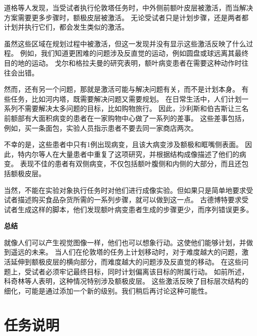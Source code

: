 道格等人\cite{dagher1999mapping}发现，当受试者执行伦敦塔任务时，中外侧前额叶皮层被激活，而当解决方案需要更多步骤时，额极皮层被激活。
无论受试者只是计划步骤，还是两者都计划并执行它们，都会发生类似的激活\cite{rowe2001imaging,unterrainer2005influence}。
\par


虽然这些区域在规划过程中被激活，但这一发现并没有显示这些激活反映了什么过程。
例如，我们知道更困难的问题涉及反直觉的运动，例如圆盘或球远离其最终目的地的运动\cite{goel1995frontal}。
戈尔和格拉夫曼\cite{goel1995frontal}的研究表明，额叶病变患者在需要这种动作时往往会出错。
\par


然而，还有另一个问题，那就是激活可能与解决问题有关，而不是计划本身。
有些任务，比如河内塔，既需要解决问题又需要规划。
在日常生活中，人们计划一系列不需要解决太多问题的目标，比如购物旅行。
因此，沙利斯和伯吉斯\cite{shallice1982specific}让三名前额部有大面积病变的患者在一家购物中心做了一系列的差事。
这些差事包括，例如，买一条面包，实验人员指示患者不要去同一家商店两次。
\par


不幸的是，这些患者中只有1例出现病变，且该大病变涉及额极和眶嘴侧表面\cite{shallice2011organisation}。
因此，特内尔等人\cite{tranel2007impaired}在大量患者中重复了这项研究，并根据结构成像描述了他们的病变。
表现不佳的患者有双侧病变，不仅包括额叶腹侧和内侧的大部分，而且还包括额极皮层。
\par


当然，不能在实验对象执行任务时对他们进行成像实验。但如果只是简单地要求受试者描述购买食品杂货所需的一系列步骤，就可以做到这一点。
古德博特\cite{godbout1995mental}要求受试者生成这样的脚本，他们发现额叶病变患者生成的步骤更少，而序列错误更多。
\par


\textbf{总结}

就像人们可以产生视觉图像一样，他们也可以想象行动。这使他们能够计划，并做到遥远的未来。
当人们在伦敦塔的任务上计划移动时，对于难度越大的问题，激活延伸到额极皮层的横向部分\cite{dagher1999mapping}，而难度越大的问题涉及反直觉的移动。
在这些问题上，受试者必须牢记最终目标，同时计划偏离该目标的附属行动。
如前所述，科奇林等人\cite{koechlin1999role}表明，这种情况特别涉及额极皮层。
这些激活反映了目标层次结构的细化，可能是通过添加一个新的级别。我们稍后再讨论这种可能性。



\section{任务说明}
\par

